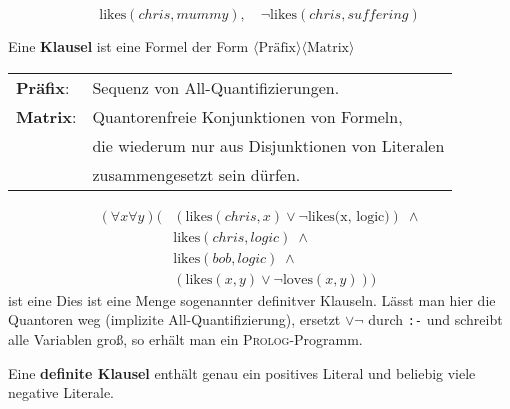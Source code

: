 \documentclass[runningheads,deutsch]{llncs}
\begin{document}
\begin{example}
    \[ \text{likes}(chris, mummy), \quad \lnot\text{likes}(chris, suffering) \]
\end{example}

Eine \textbf{Klausel} ist eine Formel der Form $\langle\text{Präfix}\rangle\langle\text{Matrix}\rangle$

\parindent0mm

\begin{tabular}{l l}
    \textbf{Präfix}: & Sequenz von All-Quantifizierungen. \\
    \textbf{Matrix}: & Quantorenfreie Konjunktionen von Formeln, \\
                     &  die wiederum nur aus Disjunktionen von Literalen \\
                     & zusammengesetzt sein dürfen.    
\end{tabular}

\begin{example}
    \begin{align*}
        (\forall x\forall y)( &(\text{likes}(chris, x) \lor \lnot \text{likes(x, logic)})\; \land \\
        & \text{likes}(chris, logic)\; \land \\
        & \text{likes}(bob, logic)\; \land \\
        & (\text{likes}(x,y) \lor \lnot \text{loves}(x, y)))
    \end{align*} ist eine 
    Dies ist eine Menge sogenannter definitver Klauseln.
    Lässt man hier die Quantoren weg (implizite All-Quantifizierung), ersetzt $\lor\lnot$ durch \texttt{:-} und schreibt alle Variablen groß, so erhält man ein \textsc{Prolog}-Programm.
\end{example}

Eine \textbf{definite Klausel} enthält genau ein positives Literal und beliebig viele negative Literale.
\end{document}
